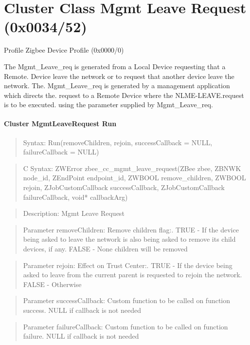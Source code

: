 \section{Cluster Class Mgmt Leave Request (0x0034/52)}

Profile Zigbee Device Profile (0x0000/0)

The Mgmt\_Leave\_req is generated from a Local Device requesting that a Remote. Device leave the network or to request that another device leave the network. The. Mgmt\_Leave\_req is generated by a management application which directs the. request to a Remote Device where the NLME-LEAVE.request is to be executed. using the parameter supplied by Mgmt\_Leave\_req.
\paragraph{Cluster MgmtLeaveRequest Run}
\begin{quote}Syntax: Run(removeChildren, rejoin, successCallback = NULL, failureCallback = NULL)\end{quote}
\begin{quote}C Syntax: ZWError zbee\_cc\_mgmt\_leave\_request(ZBee zbee, ZBNWK node\_id, ZEndPoint endpoint\_id, ZWBOOL remove\_children, ZWBOOL rejoin, ZJobCustomCallback successCallback, ZJobCustomCallback failureCallback, void* callbackArg)\end{quote}
\begin{quote}Description: Mgmt Leave Request\end{quote}
\begin{quote}Parameter removeChildren: Remove children flag:. TRUE  - If the device being asked to leave the network is also being asked to remove its child devices, if any. FALSE - None children will be removed\end{quote}
\begin{quote}Parameter rejoin: Effect on Trust Center:. TRUE  - If the device being asked to leave from the current parent is requested to rejoin the network. FALSE - Otherwise\end{quote}
\begin{quote}Parameter successCallback: Custom function to be called on function success. NULL if callback is not needed\end{quote}
\begin{quote}Parameter failureCallback: Custom function to be called on function failure. NULL if callback is not needed\end{quote}



